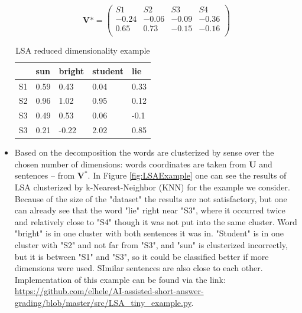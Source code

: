 \begin{itemize}
\begin{equation} \label{eq:V0}
\boldsymbol V* = \begin{pmatrix}
S1 & S2 & S3 & S4 \\
-0.24 & -0.06 & -0.09 & -0.36 \\
 0.65 & 0.73 & -0.15 & -0.16 \\
\end{pmatrix}
\end{equation}

\begin{table}[h!]
\centering
\caption{LSA reduced dimensionality example}
\label{LSAR}
\begin{tabular}{|l|l|l|l|l|}
\hline
 & sun & bright & student  & lie \\ \hline
S1 & 0.59 & 0.43 & 0.04 & 0.33 \\ \hline
S2 & 0.96 & 1.02 & 0.95 & 0.12 \\ \hline
S3 & 0.49 & 0.53 & 0.06 & -0.1 \\ \hline
S3 & 0.21 & -0.22 & 2.02 & 0.85 \\ \hline
\end{tabular}
\end{table}

\item Based on the decomposition the words are clusterized by sense over the chosen number of dimensions: words coordinates are taken from $\boldsymbol U$ and sentences -- from $\boldsymbol{V^*}$. In Figure \ref{fig:LSAExample} one can see the results of LSA clusterized by k-Nearest-Neighbor (KNN) for the example we consider. Because of the size of the "dataset" the results are not satisfactory, but one can already see that the word "lie" right near "S3", where it occurred twice and relatively close to "S4" though it was not put into the same cluster. Word "bright" is in one cluster with both sentences it was in. "Student" is in one cluster with "S2" and not far from "S3", and "sun" is clusterized incorrectly, but it is between "S1" and "S3", so it could be classified better if more dimensions were used. SImilar sentences are also close to each other. Implementation of this example can be found via the link: \url{https://github.com/elhele/AI-assisted-short-answer-grading/blob/master/src/LSA_tiny_example.py}.


\end{itemize}
